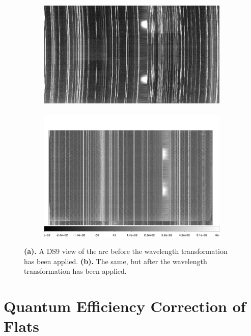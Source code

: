 \documentclass[12pt]{report}
\begin{document}
\begin{figure}[t]
\centering
\begin{subfigure}[t]{0.49\textwidth}
\includegraphics[width=\textwidth]{arc_before.jpeg}
\end{subfigure}
\hfill
\begin{subfigure}[t]{0.49\textwidth}
\includegraphics[width=\textwidth]{ds9}
\end{subfigure}
\caption[Before and After Wavelength Calibration]{\textbf{(a).} A DS9 view of the arc before the wavelength transformation has been applied. \textbf{(b).} The same, but after the wavelength transformation has been applied.}
\label{fig:skysub}
\end{figure}

\section{Quantum Efficiency Correction of Flats}
\label{qecorr}
\end{document}
